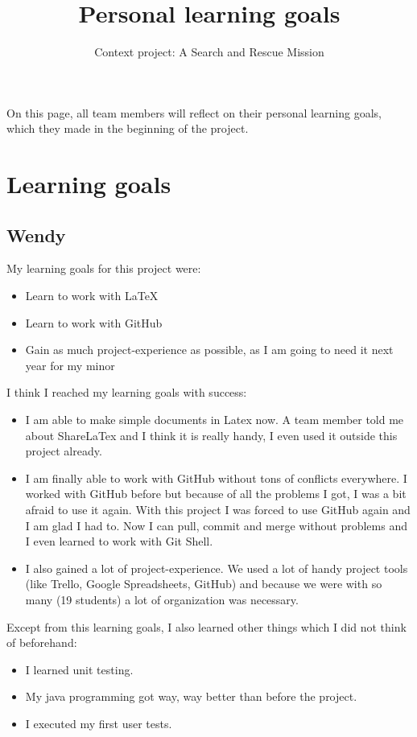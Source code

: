 \documentclass{article}
\begin{document}
\title{Personal learning goals}
\author{Context project: A Search and Rescue Mission}

\maketitle

On this page, all team members will reflect on their personal learning goals, which they made in the beginning of the project.

\section*{Learning goals} 

\subsection*{Wendy}
My learning goals for this project were:
\begin{itemize}
\item Learn to work with \LaTeX
\item Learn to work with GitHub 
\item Gain as much project-experience as possible, as I am going to need it next year for my minor
\end{itemize}
I think I reached my learning goals with success:
\begin{itemize}
\item I am able to make simple documents in Latex now. A team member told me about ShareLaTex and I think it is really handy, I even used it outside this project already.
\item I am finally able to work with GitHub without tons of conflicts everywhere. I worked with GitHub before but because of all the problems I got, I was a bit afraid to use it again. With this project I was forced to use GitHub again and I am glad I had to. Now I can pull, commit and merge without problems and I even learned to work with Git Shell. 
\item I also gained a lot of project-experience. We used a lot of handy project tools (like Trello, Google Spreadsheets, GitHub) and because we were with so many (19 students) a lot of organization was necessary. 
\end{itemize}
Except from this learning goals, I also learned other things which I did not think of beforehand: 
\begin{itemize}
\item I learned unit testing.
\item My java programming got way, way better than before the project.
\item I executed my first user tests.
\end{itemize}
\end{document}

